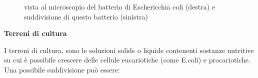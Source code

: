 \begin{figure}[H]

  \centering
   \quad
  \caption{vista al microscopio del batterio di Eschericchia coli (destra) e suddivisione di questo batterio (sinistra)}
  \label{e_coli}

\end{figure}

\textbf{Terreni di cultura}
\vspace{0.3cm}

I terreni di cultura, sono le soluzioni solide o liquide contenenti sostanze nutritive su cui è possibile crescere delle cellule eucariotiche (come E.coli) e procariotiche.
Una possibile suddivisione può essere:


